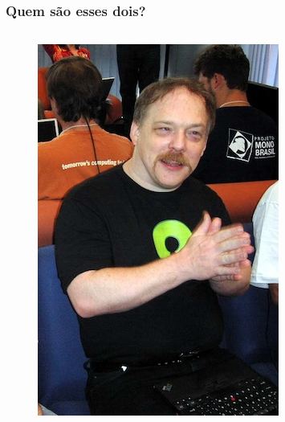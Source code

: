 \documentclass[xcolor=dvipsnames]{beamer}
\begin{document}
 \begin{frame}
 	\frametitle{Quem são esses dois?}
 
 	\begin{columns}
 \begin{column}{4.5cm}
 	\begin{figure}
 	\includegraphics[scale=0.3]{esr.jpg}\\
 	\end{figure}
 \end{column}
 \begin{column}[c]{4.5cm}
 	\begin{figure}

\end{figure}
\end{column}
\end{columns}
\end{frame}
\end{document}
